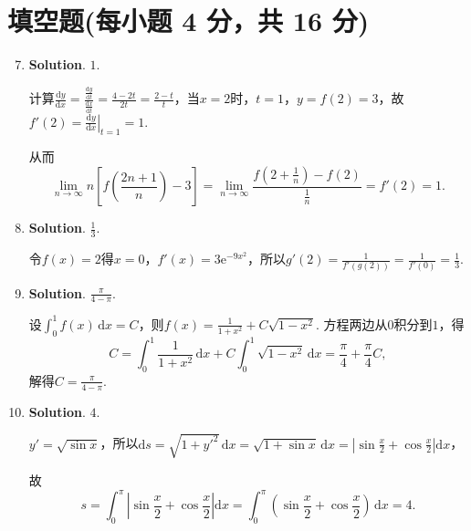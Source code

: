 \documentclass[../main.tex]{subfiles}
\begin{document}
\section{填空题(每小题 4 分，共 16 分)}
\begin{enumerate}
    \setcounter{enumi}{6}
    \item \textbf{Solution}. $1$.

          计算$\frac{\mathrm{d}y}{\mathrm{d}x}=\frac{\frac{\mathrm{d}y}{\mathrm{d}t}}{\frac{\mathrm{d}x}{\mathrm{d}t}}
              =\frac{4-2t}{2t}=\frac{2-t}{t}$，当$x=2$时，$t=1$，$y=f(2)=3$，故$f'(2)=\left
              .\frac{\mathrm{d}y}{\mathrm{d}x}\right|_{t=1}=1$.

          从而
          \[
              \lim_{n\to\infty}n\left[f\left(\frac{2n+1}{n}\right)-3\right]=\lim_{n\to\infty}
              \frac{f\left(2+\frac{1}{n}\right)-f(2)}{\frac{1}{n}}=f'(2)=1.
          \]

    \item \textbf{Solution}. $\frac{1}{3}$.

          令$f(x)=2$得$x=0$，$f'(x)=3\mathrm{e}^{-9x^2}$，所以$g'(2)=\frac{1}{f'(g(2))}
              =\frac{1}{f'(0)}=\frac{1}{3}$.

    \item \textbf{Solution}. $\frac{\pi}{4-\pi}$.

          设$\int_{0}^{1} f(x)\,\mathrm{d}x=C$，则$f(x)=\frac{1}{1+x^{2}}+C\sqrt{1-x^{2}}$. 方程两边从$0$积分到$1$，得
          \[
              C=\int_{0}^{1}\frac{1}{1+x^{2}}\,\mathrm{d}x+C\int_{0}
              ^{1}\sqrt{1-x^{2}}\,\mathrm{d}x=\frac{\pi}{4}+\frac{\pi}{4}C,
          \]
          解得$C=\frac{\pi}{4-\pi}$.

    \item \textbf{Solution}. $4$.

          $y'=\sqrt{\sin x}$，所以$\mathrm{d}s=\sqrt{1+y'^{2}}\,\mathrm{d}x=\sqrt{1+\sin
                  x}\,\mathrm{d}x=\left|\sin\frac{x}{2}+\cos\frac{x}{2}\right|\mathrm{d}x$，

          故
          \[
              s=\int_{0}^{\pi}\left|\sin\frac{x}{2}+\cos\frac{x}{2}\right|\mathrm{d}x=
              \int_{0}^{\pi}\left(\sin\frac{x}{2}+\cos\frac{x}{2}\right)\,\mathrm{d}x=4.
          \]
\end{enumerate}
\end{document}
